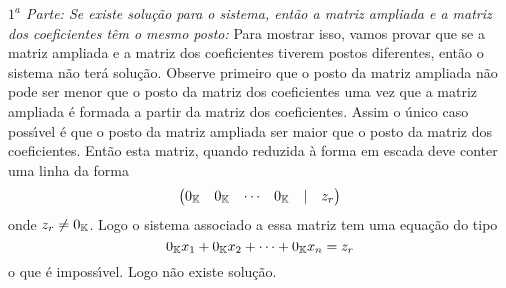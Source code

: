 \begin{prova}
	\textit{$1^a$ Parte: Se existe solu\c{c}\~ao para o sistema, ent\~ao a matriz ampliada e a matriz dos coeficientes t\^em o mesmo posto:} Para mostrar isso, vamos provar que se a matriz ampliada e a matriz dos coeficientes tiverem postos diferentes, ent\~ao o sistema n\~ao ter\'a solu\c{c}\~ao. Observe primeiro que o posto da matriz ampliada n\~ao pode ser menor que o posto da matriz dos coeficientes uma vez que a matriz ampliada \'e formada a partir da matriz dos coeficientes. Assim o \'unico caso poss{\'\i}vel \'e que o posto da matriz ampliada ser maior que o posto da matriz dos coeficientes. Ent\~ao esta matriz, quando reduzida \`a forma em escada deve conter uma linha da forma
	\[
	\begin{pmatrix}
		0_{\mathbb{K}} & 0_{\mathbb{K}} & \cdots & 0_{\mathbb{K}} & \mid & z_r
	\end{pmatrix}
	\]
	onde $z_r \ne 0_{\mathbb{K}}$.
	Logo o sistema associado a essa matriz tem uma equa\c{c}\~ao do tipo
	\[
		0_{\mathbb{K}}x_1 + 0_{\mathbb{K}}x_2 + \cdots + 0_{\mathbb{K}}x_n = z_r
	\]
	o que \'e imposs{\'\i}vel. Logo n\~ao existe solu\c{c}\~ao.


\end{prova}
